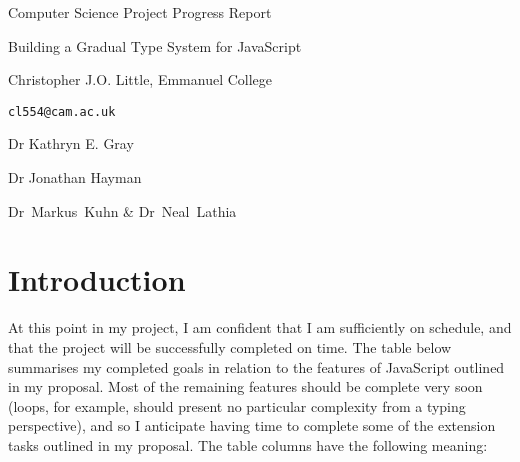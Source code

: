 \documentclass{article}
\begin{document}
	\vfil 
	\centerline{\large Computer Science Project Progress Report}
	\vspace{0.2in}
	\centerline{\Large Building a Gradual Type System for JavaScript }
	\vspace{0.1in}
	\centerline{\large Christopher J.O. Little, Emmanuel College}
	\centerline{\large \texttt{cl554@cam.ac.uk}}

	\vspace{0.3in}

	 Dr Kathryn E. Gray
	\vspace{0.2in}

	 Dr Jonathan Hayman
	\vspace{0.2in}\noindent 
	
	 Dr~Markus~Kuhn \& Dr~Neal~Lathia

	\section*{Introduction}

	At this point in my project, I am confident that I am sufficiently on
	schedule, and that the project will be successfully completed on
	time. The table below summarises my completed goals in relation to the
	features of JavaScript outlined in my proposal. Most of the remaining
	features should be complete very soon (loops, for example, should present
	no particular complexity from a typing perspective), and so I anticipate
	having time to complete some of the extension tasks outlined in my
	proposal. The table columns have the following meaning:
\end{document}
